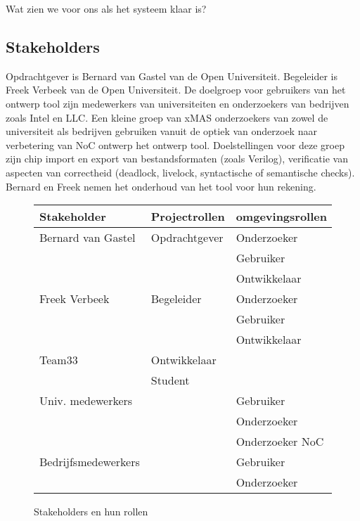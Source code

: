 Wat zien we voor ons als het systeem klaar is?

\subsection{Stakeholders}

Opdrachtgever is Bernard van Gastel van de Open Universiteit. Begeleider is Freek Verbeek van de Open Universiteit.
De doelgroep voor gebruikers van het ontwerp tool zijn medewerkers van universiteiten en onderzoekers van bedrijven zoals
Intel en LLC. Een kleine groep van xMAS onderzoekers van zowel de universiteit als bedrijven gebruiken vanuit de optiek
van onderzoek naar verbetering van NoC ontwerp het ontwerp tool. Doelstellingen voor deze groep zijn chip import
en export van bestandsformaten (zoals Verilog), verificatie van aspecten van correctheid (deadlock, livelock,
syntactische of semantische checks). Bernard en Freek nemen het onderhoud van het tool voor hun rekening.


\begin{figure}
{\tiny
\begin{center}
\begin{tabular}{lll}\hline
{\bf Stakeholder}    & {\bf Projectrollen}   & {\bf omgevingsrollen} \\\hline
Bernard van Gastel   & Opdrachtgever         & Onderzoeker \\
                     &                       & Gebruiker \\
                     &                       & Ontwikkelaar \\
Freek Verbeek        & Begeleider            & Onderzoeker \\
                     &                       & Gebruiker \\
                     &                       & Ontwikkelaar \\
Team33               & Ontwikkelaar          & \\
                     & Student               & \\
Univ. medewerkers    &                       & Gebruiker \\
                     &                       & Onderzoeker \\
                     &                       & Onderzoeker NoC \\
Bedrijfsmedewerkers  &                       & Gebruiker \\
                     &                       & Onderzoeker \\
\hline
\end{tabular}
\end{center}
}%
\caption{Stakeholders en hun rollen}\label{fig:stakeholders}
\end{figure}

